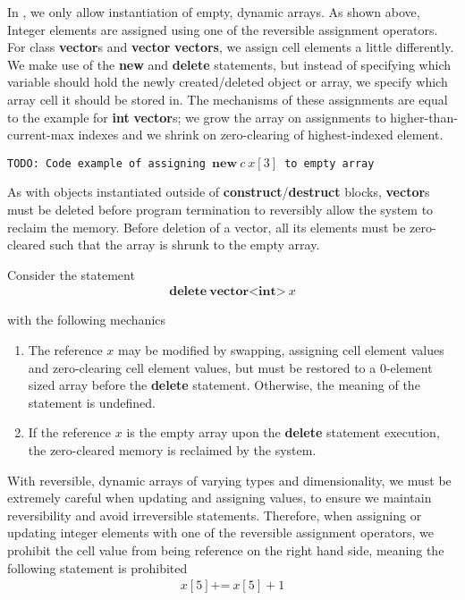 In \rooplpp, we only allow instantiation of empty, dynamic arrays. As shown above, Integer elements are assigned using one of the reversible assignment operators. For class \textbf{vector}s and \textbf{vector} \textbf{vectors}, we assign cell elements a little differently. We make use of the \textbf{new} and \textbf{delete} statements, but instead of specifying which variable should hold the newly created/deleted object or array, we specify which array cell it should be stored in. The mechanisms of these assignments are equal to the example for \textbf{int} \textbf{vector}s; we grow the array on assignments to higher-than-current-max indexes and we shrink on zero-clearing of highest-indexed element.

\texttt{TODO: Code example of assigning $\textbf{new}\ c\ x[3]$ to empty array}

As with \rooplpp objects instantiated outside of \textbf{construct}/\textbf{destruct} blocks, \textbf{vector}s must be deleted before program termination to reversibly allow the system to reclaim the memory. Before deletion of a vector, all its elements must be zero-cleared such that the array is shrunk to the empty array.

Consider the statement
\begin{align*}
\textbf{delete}\ \textbf{vector}\texttt{<}\textbf{int}\texttt{>}\ x
\end{align*}

with the following mechanics

\begin{enumerate}
\item The reference $x$ may be modified by swapping, assigning cell element values and zero-clearing cell element values, but must be restored to a 0-element sized array before the \textbf{delete} statement. Otherwise, the meaning of the statement is undefined.
\item If the reference $x$ is the empty array upon the \textbf{delete} statement execution, the zero-cleared memory is reclaimed by the system.
\end{enumerate}

With reversible, dynamic arrays of varying types and dimensionality, we must be extremely careful when updating and assigning values, to ensure we maintain reversibility and avoid irreversible statements. Therefore, when assigning or updating integer elements with one of the reversible assignment operators, we prohibit the cell value from being reference on the right hand side, meaning the following statement is prohibited
\begin{align*}
x[5] \texttt{+=}\ x[5] + 1 
\end{align*}

